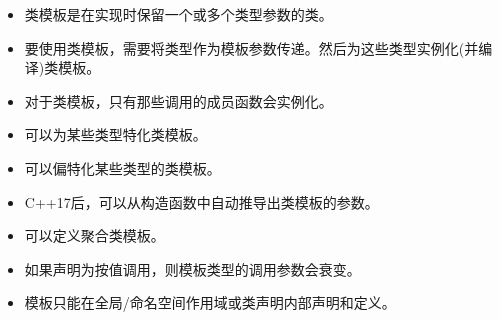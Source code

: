 
\begin{itemize}
\item 
类模板是在实现时保留一个或多个类型参数的类。

\item 
要使用类模板，需要将类型作为模板参数传递。然后为这些类型实例化(并编译)类模板。

\item 
对于类模板，只有那些调用的成员函数会实例化。

\item 
可以为某些类型特化类模板。

\item 
可以偏特化某些类型的类模板。

\item 
C++17后，可以从构造函数中自动推导出类模板的参数。

\item 
可以定义聚合类模板。

\item 
如果声明为按值调用，则模板类型的调用参数会衰变。

\item 
模板只能在全局/命名空间作用域或类声明内部声明和定义。
\end{itemize}